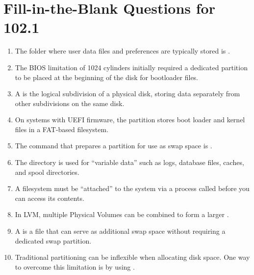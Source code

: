 \documentclass[a4paper]{report}
\begin{document}
\section*{Fill-in-the-Blank Questions for 102.1}

\begin{enumerate}[1.]

\item The folder where user data files and preferences are typically stored is \underline{\hspace{2cm}}.

\item The BIOS limitation of 1024 cylinders initially required a dedicated \underline{\hspace{2cm}} partition to be placed at the beginning of the disk for bootloader files.

\item A \underline{\hspace{2cm}} is the logical subdivision of a physical disk, storing data separately from other subdivisions on the same disk.

\item On systems with UEFI firmware, the \underline{\hspace{2cm}} partition stores boot loader and kernel files in a FAT-based filesystem.

\item The command that prepares a partition for use as swap space is \underline{\hspace{2cm}}.

\item The directory \underline{\hspace{2cm}} is used for “variable data” such as logs, database files, caches, and spool directories.

\item A filesystem must be “attached” to the system via a process called \underline{\hspace{2cm}} before you can access its contents.

\item In LVM, multiple Physical Volumes can be combined to form a larger \underline{\hspace{2cm}}.

\item A \underline{\hspace{2cm}} is a file that can serve as additional swap space without requiring a dedicated swap partition.

\item Traditional partitioning can be inflexible when allocating disk space. One way to overcome this limitation is by using \underline{\hspace{2cm}}.

\end{enumerate}
\end{document}
